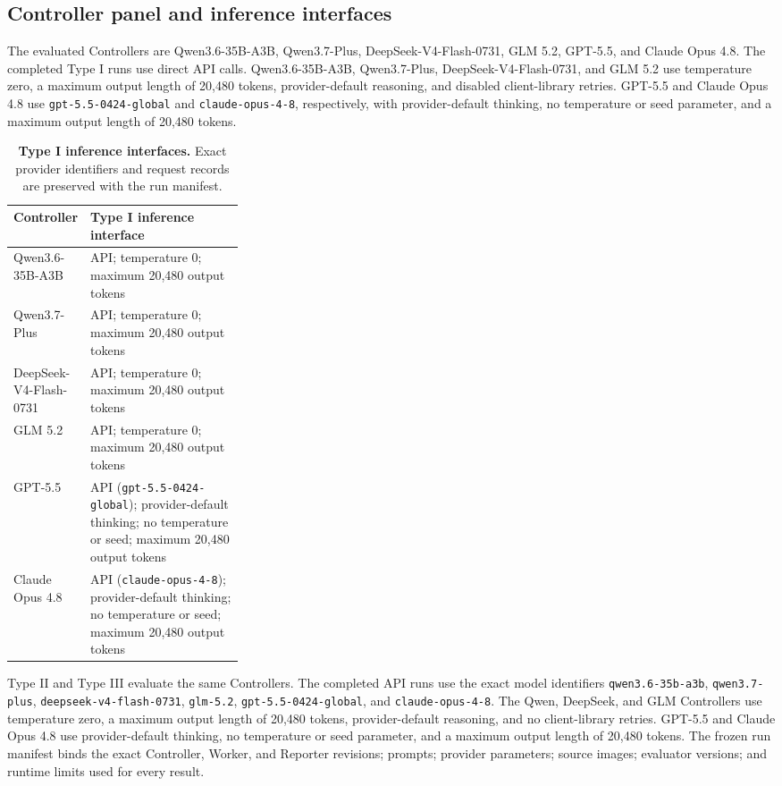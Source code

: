 \subsection{Controller panel and inference interfaces}

The evaluated Controllers are Qwen3.6-35B-A3B, Qwen3.7-Plus, DeepSeek-V4-Flash-0731, GLM 5.2, GPT-5.5, and Claude Opus 4.8. The completed Type I runs use direct API calls. Qwen3.6-35B-A3B, Qwen3.7-Plus, DeepSeek-V4-Flash-0731, and GLM 5.2 use temperature zero, a maximum output length of 20,480 tokens, provider-default reasoning, and disabled client-library retries. GPT-5.5 and Claude Opus 4.8 use \texttt{gpt-5.5-0424-global} and \texttt{claude-opus-4-8}, respectively, with provider-default thinking, no temperature or seed parameter, and a maximum output length of 20,480 tokens.

\begin{table}[H]
\caption{\textbf{Type I inference interfaces.} Exact provider identifiers and request records are preserved with the run manifest.}
\label{tab:type-i-inference}
\centering
\small
\begin{tabularx}{\linewidth}{@{}>{\raggedright\arraybackslash}p{0.30\linewidth}>{\raggedright\arraybackslash}X@{}}
\toprule
Controller & Type I inference interface \\
\midrule
Qwen3.6-35B-A3B & API; temperature 0; maximum 20,480 output tokens \\
Qwen3.7-Plus & API; temperature 0; maximum 20,480 output tokens \\
DeepSeek-V4-Flash-0731 & API; temperature 0; maximum 20,480 output tokens \\
GLM 5.2 & API; temperature 0; maximum 20,480 output tokens \\
GPT-5.5 & API (\texttt{gpt-5.5-0424-global}); provider-default thinking; no temperature or seed; maximum 20,480 output tokens \\
Claude Opus 4.8 & API (\texttt{claude-opus-4-8}); provider-default thinking; no temperature or seed; maximum 20,480 output tokens \\
\bottomrule
\end{tabularx}
\end{table}

Type II and Type III evaluate the same Controllers. The completed API runs use the exact model identifiers \texttt{qwen3.6-35b-a3b}, \texttt{qwen3.7-plus}, \texttt{deepseek-v4-flash-0731}, \texttt{glm-5.2}, \texttt{gpt-5.5-0424-global}, and \texttt{claude-opus-4-8}. The Qwen, DeepSeek, and GLM Controllers use temperature zero, a maximum output length of 20,480 tokens, provider-default reasoning, and no client-library retries. GPT-5.5 and Claude Opus 4.8 use provider-default thinking, no temperature or seed parameter, and a maximum output length of 20,480 tokens. The frozen run manifest binds the exact Controller, Worker, and Reporter revisions; prompts; provider parameters; source images; evaluator versions; and runtime limits used for every result.

